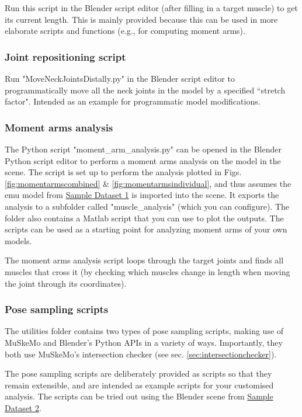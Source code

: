 \documentclass{article}
\begin{document}
Run this script in the Blender script editor (after filling in a target muscle) to get its current length. This is mainly provided because this can be used in more elaborate scripts and functions (e.g., for computing moment arms).

\subsubsection{Joint repositioning script}

Run "MoveNeckJointsDistally.py" in the Blender script editor to programmatically move all the neck joints in the model by a specified ``stretch factor". Intended as an example for programmatic model modifications.


\subsubsection{Moment arms analysis}
The Python script "moment\_arm\_analysis.py" can be opened in the Blender Python script editor to perform a moment arms analysis on the model in the scene. The script is set up to perform the analysis plotted in Figs. \ref{fig:momentarmscombined} \& \ref{fig:momentarmsindividual}, and thus assumes the emu model from \href{https://github.com/PashavanBijlert/MuSkeMo/releases/tag/v0.x-sampledataset1}{Sample Dataset 1} is imported into the scene. It exports the analysis to a subfolder called "muscle\_analysis" (which you can configure). The folder also contains a Matlab script that you can use to plot the outputs. The scripts can be used as a starting point for analyzing moment arms of your own models.

The moment arms analysis script loops through the target joints and finds all muscles that cross it (by checking which muscles change in length when moving the joint through its coordinates).

\subsubsection{Pose sampling scripts}
\label{sec:posesampling}

The utilities folder contains two types of pose sampling scripts, making use of MuSkeMo and Blender's Python APIs in a variety of ways. Importantly, they both use MuSkeMo's intersection checker (see sec. \ref{sec:intersectionchecker}).

The pose sampling scripts are deliberately provided as scripts so that they remain extensible, and are intended as example scripts for your customised analysis. The scripts can be tried out using the Blender scene from \href{https://github.com/PashavanBijlert/MuSkeMo/releases/tag/v0.x-sampledataset2}{Sample Dataset 2}.
\end{document}
